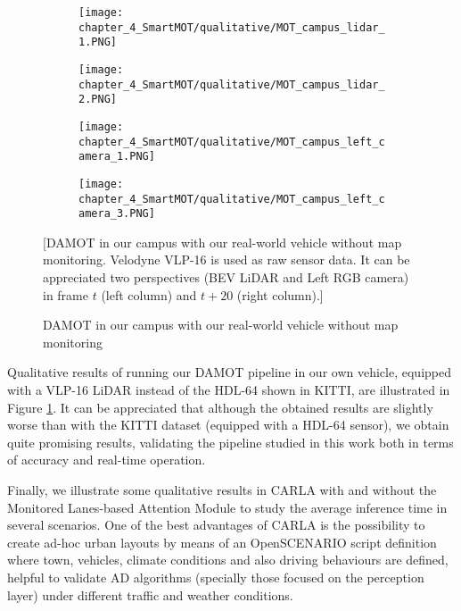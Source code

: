 \begin{figure}[h]
	\centering
	\begin{subfigure}{0.43\textwidth}
		\captionsetup{justification=centering}
		\texttt{[image: chapter\_4\_SmartMOT/qualitative/MOT\_campus\_lidar\_1.PNG]}
		\caption{}
	\end{subfigure}
	\hfill
	\begin{subfigure}{0.43\textwidth}
		\captionsetup{justification=centering}
		\texttt{[image: chapter\_4\_SmartMOT/qualitative/MOT\_campus\_lidar\_2.PNG]}
		\caption{}
	\end{subfigure}
	\hfill
	\begin{subfigure}{0.43\textwidth}
		\captionsetup{justification=centering}
		\texttt{[image: chapter\_4\_SmartMOT/qualitative/MOT\_campus\_left\_camera\_1.PNG]}
		\caption{}
	\end{subfigure}
	\hfill
	\begin{subfigure}{0.43\textwidth}
		\captionsetup{justification=centering}
		\texttt{[image: chapter\_4\_SmartMOT/qualitative/MOT\_campus\_left\_camera\_3.PNG]}
		\caption{}
	\end{subfigure}
	\caption{\ac{DAMOT} in our campus with our real-world vehicle without map monitoring}[\ac{DAMOT} in our campus with our real-world vehicle without map monitoring. Velodyne VLP-16 is used as raw sensor data. It can be appreciated two perspectives (\ac{BEV} \ac{LiDAR} and Left RGB camera) in frame $t$ (left column) and $t+20$ (right column).]
	\label{fig:chapter_4_SmartMOT/MOT_campus}
\end{figure}

Qualitative results of running our \ac{DAMOT} pipeline in our own vehicle, equipped with a VLP-16 \ac{LiDAR} instead of the HDL-64 shown in KITTI, are illustrated in Figure \ref{fig:chapter_4_SmartMOT/MOT_campus}. It can be appreciated that although the obtained results are slightly worse than with the KITTI dataset (equipped with a HDL-64 sensor), we obtain quite promising results, validating the pipeline studied in this work both in terms of accuracy and real-time operation.

Finally, we illustrate some qualitative results in \ac{CARLA} with and without the Monitored Lanes-based Attention Module to study the average inference time in several scenarios. One of the best advantages of \ac{CARLA} is the possibility to create ad-hoc urban layouts by means of an OpenSCENARIO \cite{jullien2009openscenario} script definition where town, vehicles, climate conditions and also driving behaviours are defined, helpful to validate \ac{AD} algorithms (specially those focused on the perception layer) under different traffic and weather conditions. 

